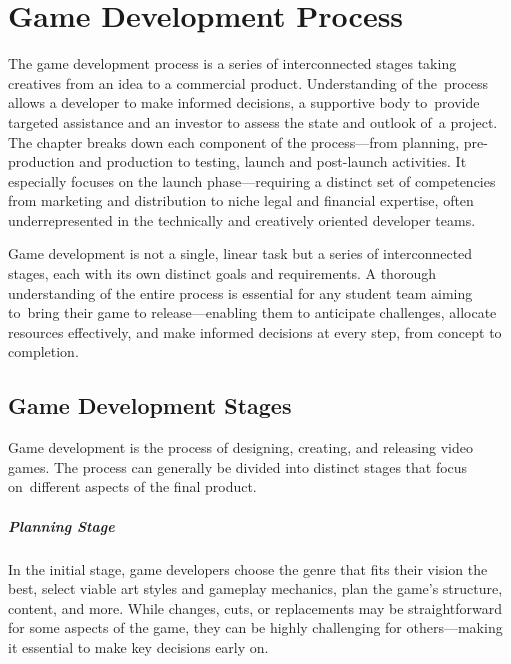 \chapter{Game Development Process}\label{chap:game-dev}

\begin{chapterabstract}
	The game development process is a series of interconnected stages taking creatives from an idea to a commercial product. Understanding of the~process allows a developer to make informed decisions, a supportive body to~provide targeted assistance and an investor to assess the state and outlook of~a project. The chapter breaks down each component of the process---from planning, pre-production and production to testing, launch and post-launch activities. It especially focuses on the launch phase---requiring a distinct set of competencies from marketing and distribution to niche legal and financial expertise, often underrepresented in the technically and creatively oriented developer teams.
\end{chapterabstract}

Game development is not a single, linear task but a series of interconnected stages, each with its own distinct goals and requirements. A thorough understanding of the entire process is essential for any student team aiming to~bring their game to release---enabling them to anticipate challenges, allocate resources effectively, and make informed decisions at every step, from concept to completion.

\section{Game Development Stages}
Game development is the process of designing, creating, and releasing video games. The process can generally be divided into distinct stages that focus on~different aspects of the final product.
\cite{bramble_7-stages, rocket_6-stages}

\paragraph{Planning Stage}
In the initial stage, game developers choose the genre that fits their vision the best, select viable art styles and gameplay mechanics, plan the game’s structure, content, and more. While changes, cuts, or replacements may be straightforward for some aspects of the game, they can be highly challenging for others—making it essential to make key decisions early on.
\cite{bramble_7-stages, rocket_6-stages}

